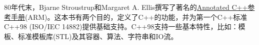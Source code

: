 
80年代末，Bjarne Stroustrup和Margaret A. Ellis撰写了著名的\href{https://www.stroustrup.com/arm.html}{Annotated C++参考手册}(ARM)。这本书有两个目的，定义了C++的功能，并为第一个C++标准C++98 (ISO/IEC 14882)提供基础支持。C++98支持一些基本特性，比如：模板、标准模板库(STL)及其容器、算法、字符串和IO流。